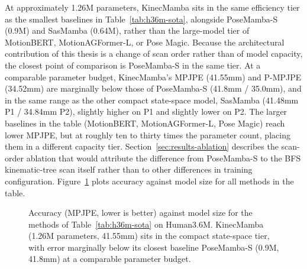 At approximately 1.26M parameters, KinecMamba sits in the same
efficiency tier as the smallest baselines in Table~\ref{tab:h36m-sota},
alongside PoseMamba-S (0.9M) and SasMamba (0.64M), rather
than the large-model tier of MotionBERT, MotionAGFormer-L, or Pose Magic.
Because the architectural contribution of this thesis is a change of scan
order rather than of model capacity, the closest point of comparison is
PoseMamba-S in the same tier. At a comparable parameter budget, KinecMamba's
MPJPE (41.55mm) and P-MPJPE (34.52mm) are marginally below those of
PoseMamba-S (41.8mm / 35.0mm), and in the same range as the other compact
state-space model, SasMamba (41.48mm P1 / 34.84mm P2), slightly higher on P1
and slightly lower on P2. The larger baselines in the table (MotionBERT,
MotionAGFormer-L, Pose Magic) reach lower MPJPE, but at roughly ten to thirty
times the parameter count, placing them in a different capacity tier.
Section~\ref{sec:results-ablation} describes the
scan-order ablation that would attribute the difference from PoseMamba-S to
the BFS kinematic-tree scan itself rather than to other differences in
training configuration. Figure~\ref{fig:results-plot} plots accuracy against
model size for all methods in the table.

\begin{figure}[t]
\centering
{}
\caption[Accuracy versus model size on Human3.6M.]{Accuracy (MPJPE, lower is
  better) against model size for the methods of Table~\ref{tab:h36m-sota} on
  Human3.6M. KinecMamba (1.26M parameters, 41.55mm) sits in the compact
  state-space tier, with error marginally below its closest baseline
  PoseMamba-S (0.9M, 41.8mm) at a comparable parameter budget.}
\label{fig:results-plot}
\end{figure}

